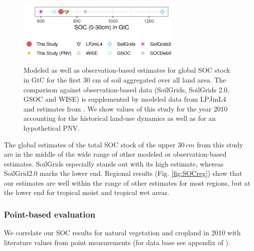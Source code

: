 \documentclass[gc, manuscript]{copernicus}
\begin{document}
\begin{figure}[h]
\includegraphics[width=8cm]{../ResultNotebooks/Output/Images/glo_comparisonfigure} \caption{Modeled as well as observation-based estimates for global SOC stock in GtC for the first 30 cm of soil aggregated over all land area. The comparison against observation-based data (SoilGrids, SoilGrids 2.0, GSOC and WISE) is supplemented by modeled data from LPJmL4 \citep{schaphoff_lpjml4_2018-1} and estimates from \citep{sanderman_soil_2017}. We show values of this study for the year 2010 accounting for the historical land-use dynamics as well as for an hypothetical PNV.}\label{fig:SOCglo}
\end{figure}

The global estimates of the total SOC stock of the upper \(30\,cm\) from this study are in the middle of the wide range of other modeled or observation-based estimates. SoilGrids \citep{hengl_soilgrids250m_2017} especially stands out with its high estimate, whereas SoilGrid2.0 \citep{poggio_soilgrids_2021} marks the lower end. Regional results (Fig. \ref{fig:SOCreg}) show that our estimates are well within the range of other estimates for most regions, but at the lower end for tropical moist and tropical wet areas.

\hypertarget{point-based-evaluation}{%
\subsubsection{Point-based evaluation}\label{point-based-evaluation}}

We correlate our SOC results for natural vegetation and cropland in 2010 with literature values from point measurements (for data base see appendix of \citep{sanderman_soil_2017}).
\end{document}
